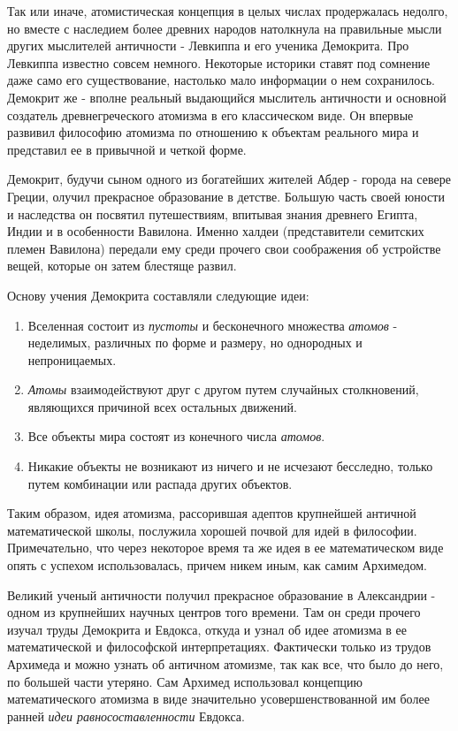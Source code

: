 Так или иначе, атомистическая концепция в целых числах продержалась недолго, но вместе с наследием более древних народов натолкнула на правильные мысли других мыслителей античности - Левкиппа и его ученика Демокрита.
Про Левкиппа известно совсем немного.
Некоторые историки ставят под сомнение даже само его существование, настолько мало информации о нем сохранилось.
Демокрит же - вполне реальный выдающийся мыслитель античности и основной создатель древнегреческого атомизма в его классическом виде. 
Он впервые развивил философию атомизма по отношению к объектам реального мира и представил ее в привычной и четкой форме.

Демокрит, будучи сыном одного из богатейших жителей Абдер - города на севере Греции, олучил прекрасное образование в детстве.
Большую часть своей юности и наследства он посвятил путешествиям, впитывая знания древнего Египта, Индии и в особенности Вавилона.
Именно халдеи (представители семитских племен Вавилона) передали ему среди прочего свои соображения об устройстве вещей, которые он затем блестяще развил.

Основу учения Демокрита составляли следующие идеи:
\begin{enumerate}
    \item Вселенная состоит из \textit{пустоты} и бесконечного множества \textit{атомов} - неделимых, различных по форме и размеру, но однородных и непроницаемых.
    \item \textit{Атомы} взаимодействуют друг с другом путем случайных столкновений, являющихся причиной всех остальных движений. 
    \item Все объекты мира состоят из конечного числа \textit{атомов}.
    \item Никакие объекты не возникают из ничего и не исчезают бесследно, только путем комбинации или распада других объектов.
\end{enumerate} 

Таким образом, идея атомизма, рассорившая адептов крупнейшей античной математической школы, послужила хорошей почвой для идей в философии. 
Примечательно, что через некоторое время та же идея в ее математическом виде опять с успехом использовалась, причем никем иным, как самим Архимедом.

Великий ученый античности получил прекрасное образование в Александрии - одном из крупнейших научных центров того времени. 
Там он среди прочего изучал труды Демокрита и Евдокса, откуда и узнал об идее атомизма в ее математической и философской интерпретациях.
Фактически только из трудов Архимеда и можно узнать об античном атомизме, так как все, что было до него, по большей части утеряно.
Сам Архимед использовал концепцию математического атомизма в виде значительно усовершенствованной им более ранней \textit{идеи равносоставленности} Евдокса.

